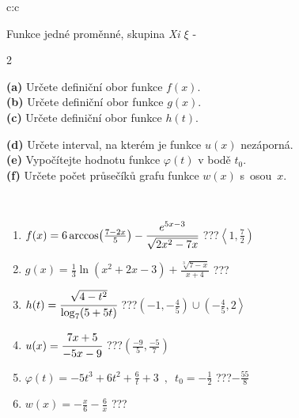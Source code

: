 \documentclass[10pt]{report}
\begin{document}
\begin{tabular}{c:c}
\begin{minipage}[c][104.5mm][t]{0.5\linewidth}
\begin{center}
{\huge Funkce jedné proměnné, skupina \textit{Xi $\xi$} -}\\[5mm]
\begin{minipage}{0.95\linewidth}
\begin{center}
{\small \begin{multicols}{2} \raggedright
\textbf{(a)} Určete definiční obor funkce \(f(x)\). \\[1mm]
\textbf{(b)} Určete definiční obor funkce \(g(x)\). \\[1mm]
\textbf{(c)} Určete definiční obor funkce \(h(t)\). \par \columnbreak
\textbf{(d)} Určete interval, na kterém je funkce \(u(x)\) nezáporná. \\[1mm]
\textbf{(e)} Vypočítejte hodnotu funkce \(\varphi(t)\) v bodě \(t_0\). \\[1mm]
\textbf{(f)} Určete počet průsečíků grafu funkce \(w(x)\) s~osou~\(x\). \\[1mm]
\end{multicols}
}
\end{center}
\end{minipage}
\\[4mm]
\begin{minipage}{0.79\linewidth}
\begin{center}
\begin{varwidth}{\linewidth}
\begin{enumerate}
\small
\item $f(x) = 6\arccos\!\left( \frac{7-2x}{5} \right) - \cfrac{e^{5x-3}}{\sqrt{2x^2-7x}}$\quad \dotfill\; ???\;\dotfill \quad $\left\langle1 , \frac{7}{2}\right)$
\item $g(x) = \frac{1}{3} \ln{\!(x^2+2x-3)}+\frac{\sqrt[3]{7-x}}{x+4}$\quad \dotfill\; ???\;\dotfill {}
\item $h(t) = \cfrac{\sqrt{4-t^2}}{\log_7(5+5t)}$\quad \dotfill\; ???\;\dotfill \quad $\left(-1 , -\frac{4}{5}\right)\cup\left(-\frac{4}{5} , 2\right\rangle$
\item $u(x) = \cfrac{7x+5}{-5x-9}$\quad \dotfill\; ???\;\dotfill \quad $\left(\frac{-9}{5} , \frac{-5}{7}\right)$
\item $\varphi(t) = -5t^3+6t^2+\frac{6}{t}+3 \enspace , \enspace t_0=-\frac{1}{2}$\quad \dotfill\; ???\;\dotfill \quad $-\frac{55}{8}$
\item $w(x) = -\frac{x}{6}-\frac{6}{x}$\quad \dotfill\; ???\;\dotfill {}
\end{enumerate}

\end{varwidth}
\end{center}
\end{minipage}
\end{center}
\end{minipage}
\end{tabular}
\end{document}

